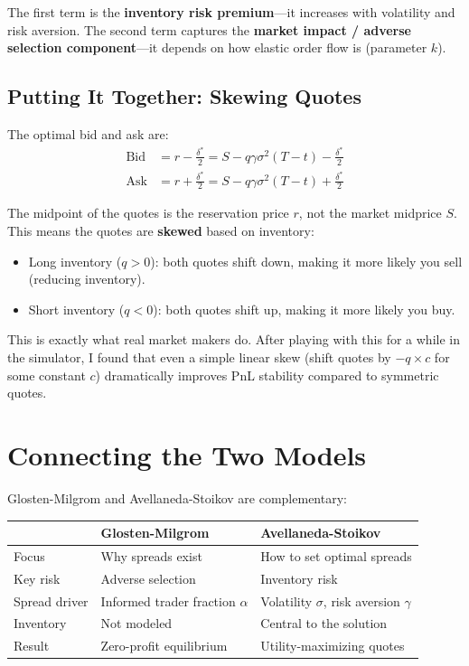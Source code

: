 \documentclass[11pt]{article}
\begin{document}
The first term is the \textbf{inventory risk premium}---it increases with volatility and risk aversion. The second term captures the \textbf{market impact / adverse selection component}---it depends on how elastic order flow is (parameter $k$).

\subsection{Putting It Together: Skewing Quotes}

The optimal bid and ask are:
\begin{align*}
\text{Bid} &= r - \frac{\delta^*}{2} = S - q\gamma\sigma^2(T-t) - \frac{\delta^*}{2} \\
\text{Ask} &= r + \frac{\delta^*}{2} = S - q\gamma\sigma^2(T-t) + \frac{\delta^*}{2}
\end{align*}

The midpoint of the quotes is the reservation price $r$, not the market midprice $S$. This means the quotes are \textbf{skewed} based on inventory:
\begin{itemize}
\item Long inventory ($q > 0$): both quotes shift down, making it more likely you sell (reducing inventory).
\item Short inventory ($q < 0$): both quotes shift up, making it more likely you buy.
\end{itemize}

This is exactly what real market makers do. After playing with this for a while in the simulator, I found that even a simple linear skew (shift quotes by $-q \times c$ for some constant $c$) dramatically improves PnL stability compared to symmetric quotes.

\section{Connecting the Two Models}

Glosten-Milgrom and Avellaneda-Stoikov are complementary:

\begin{center}
\begin{tabular}{lll}
& \textbf{Glosten-Milgrom} & \textbf{Avellaneda-Stoikov} \\
\hline
Focus & Why spreads exist & How to set optimal spreads \\
Key risk & Adverse selection & Inventory risk \\
Spread driver & Informed trader fraction $\alpha$ & Volatility $\sigma$, risk aversion $\gamma$ \\
Inventory & Not modeled & Central to the solution \\
Result & Zero-profit equilibrium & Utility-maximizing quotes \\
\end{tabular}
\end{center}
\end{document}
